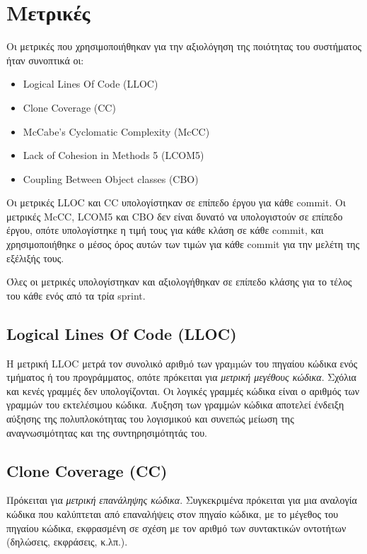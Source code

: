 \section{Μετρικές}

Οι μετρικές που χρησιμοποιήθηκαν για την αξιολόγηση της ποιότητας του
συστήματος ήταν συνοπτικά οι:
\begin{itemize}
	\item Logical Lines Of Code (LLOC)
	\item Clone Coverage (CC)
	\item McCabe's Cyclomatic Complexity (McCC)
	\item Lack of Cohesion in Methods 5 (LCOM5)
	\item Coupling Between Object classes (CBO)
\end{itemize}

Οι μετρικές LLOC και CC υπολογίστηκαν σε επίπεδο έργου για κάθε commit.
Οι μετρικές McCC, LCOM5 και CBO δεν είναι δυνατό να υπολογιστούν σε επίπεδο έργου,
οπότε υπολογίστηκε η τιμή τους για κάθε κλάση σε κάθε commit, και
χρησιμοποιήθηκε ο μέσος όρος αυτών των τιμών για κάθε commit για την
μελέτη της εξέλιξής τους.

Όλες οι μετρικές υπολογίστηκαν και αξιολογήθηκαν σε επίπεδο κλάσης για
το τέλος του κάθε ενός από τα τρία sprint.

\subsection{Logical Lines Of Code (LLOC)}

Η μετρική LLOC μετρά τον συνολικό αριθµό των γραµµών του πηγαίου κώδικα
ενός τμήματος ή του προγράμματος, οπότε πρόκειται για \emph{μετρική
μεγέθους κώδικα}. Σχόλια και κενές γραμμές δεν υπολογίζονται. Οι
λογικές γραμμές κώδικα είναι ο αριθμός των γραμμών του εκτελέσιμου
κώδικα. Άυξηση των γραμμών κώδικα αποτελεί
ένδειξη αύξησης της πολυπλοκότητας του λογισμικού και συνεπώς μείωση της
αναγνωσιμότητας και της συντηρησιμότητάς του.

\subsection{Clone Coverage (CC)}

Πρόκειται για \emph{μετρική επανάληψης κώδικα}. Συγκεκριμένα πρόκειται
για μια αναλογία κώδικα που καλύπτεται από επαναλήψεις στον πηγαίο
κώδικα, με το μέγεθος του πηγαίου κώδικα, εκφρασμένη σε σχέση με τον
αριθμό των συντακτικών οντοτήτων (δηλώσεις, εκφράσεις, κ.λπ.).

